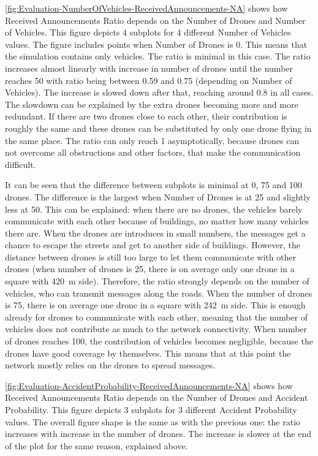 \documentclass[]{nsm-thesis}
\begin{document}
\cref{fig:Evaluation-NumberOfVehicles-ReceivedAnnouncements-NA} shows how Received Announcements Ratio depends on the Number of Drones and Number of Vehicles. This figure depicts 4 subplots for 4 different Number of Vehicles values. The figure includes points when Number of Drones is 0. This means that the simulation contains only vehicles. The ratio is minimal in this case. The ratio increases almost linearly with increase in number of drones until the number reaches 50 with ratio being between 0.59 and 0.75 (depending on Number of Vehicles). The increase is slowed down after that, reaching around 0.8 in all cases. The slowdown can be explained by the extra drones becoming more and more redundant. If there are two drones close to each other, their contribution is roughly the same and these drones can be substituted by only one drone flying in the same place. The ratio can only reach 1 asymptotically, because drones can not overcome all obstructions and other factors, that make the communication difficult.

It can be seen that the difference between subplots is minimal at 0, 75 and 100 drones. The difference is the largest when Number of Drones is at 25 and slightly less at 50. This can be explained: when there are no drones, the vehicles barely communicate with each other because of buildings, no matter how many vehicles there are. When the drones are introduces in small numbers, the messages get a chance to escape the streets and get to another side of buildings. However, the distance between drones is still too large to let them communicate with other drones (when number of drones is 25, there is on average only one drone in a square with \SI{420}{\meter} side). Therefore, the ratio strongly depends on the number of vehicles, who can transmit messages along the roads. When the number of drones is 75, there is on average one drone in a square with \SI{242}{\meter} side. This is enough already for drones to communicate with each other, meaning that the number of vehicles does not contribute as much to the network connectivity. When number of drones reaches 100, the contribution of vehicles becomes negligible, because the drones have good coverage by themselves. This means that at this point the network mostly relies on the drones to spread messages.

\cref{fig:Evaluation-AccidentProbability-ReceivedAnnouncements-NA} shows how Received Announcements Ratio depends on the Number of Drones and Accident Probability. This figure depicts 3 subplots for 3 different Accident Probability values. The overall figure shape is the same as with the previous one: the ratio increases with increase in the number of drones. The increase is slower at the end of the plot for the same reason, explained above. 
\end{document}
